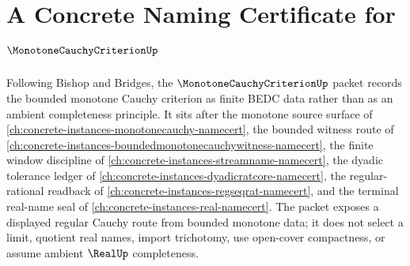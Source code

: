 \chapter{A Concrete Naming Certificate for $\MonotoneCauchyCriterionUp$}
\label{ch:concrete-instances-monotone-cauchy-criterion-namecert}

Following Bishop and Bridges, the $\MonotoneCauchyCriterionUp$ packet records the bounded monotone Cauchy criterion as finite BEDC data rather than as an ambient completeness principle. It sits after the monotone source surface of \autoref{ch:concrete-instances-monotonecauchy-namecert}, the bounded witness route of \autoref{ch:concrete-instances-boundedmonotonecauchywitness-namecert}, the finite window discipline of \autoref{ch:concrete-instances-streamname-namecert}, the dyadic tolerance ledger of \autoref{ch:concrete-instances-dyadicratcore-namecert}, the regular-rational readback of \autoref{ch:concrete-instances-regseqrat-namecert}, and the terminal real-name seal of \autoref{ch:concrete-instances-real-namecert}. The packet exposes a displayed regular Cauchy route from bounded monotone data; it does not select a limit, quotient real names, import trichotomy, use open-cover compactness, or assume ambient $\RealUp$ completeness.

